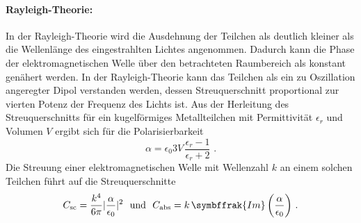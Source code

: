 \paragraph{Rayleigh-Theorie:}
In der Rayleigh-Theorie wird die Ausdehnung der Teilchen als deutlich kleiner als die Wellenlänge des eingestrahlten Lichtes angenommen. Dadurch kann die Phase der elektromagnetischen Welle über den betrachteten Raumbereich als konstant genähert werden. In der Rayleigh-Theorie kann das Teilchen als ein zu Oszillation angeregter Dipol verstanden werden, dessen Streuquerschnitt proportional zur vierten Potenz der Frequenz des Lichts ist. Aus der Herleitung des Streuquerschnitts für ein kugelförmiges Metallteilchen mit Permittivität $\epsilon_r$  und Volumen $V$ ergibt sich für die Polarisierbarkeit
\begin{equation}
  \alpha = \epsilon_0 3 V\, \frac{\epsilon_r-1}{\epsilon_r+2}\,\,.
  \label{eqn:polbarkeit}
\end{equation}
Die Streuung einer elektromagnetischen Welle mit Wellenzahl $k$ an einem solchen Teilchen führt auf die Streuquerschnitte
\begin{equation}
  C_{\text{sc}} = \frac{k^4}{6\pi}|\frac{\alpha}{\epsilon_0}|^2 \,\,\,\, \text{und}\,\,\,\, C_{\text{abs}} = k\, \symbffrak{Im}\left(\frac{\alpha}{\epsilon_0}\right)\,.
  \label{eqn:rayleigh}
\end{equation}
